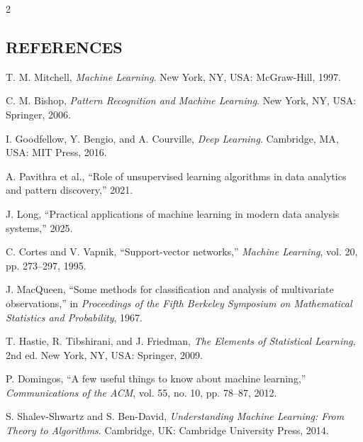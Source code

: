 \begin{multicols}{2}
  \subsection*{\centering\uppercase{References}}
  {\small
  \begin{justify}
    \begin{enumerate}[label={\relax[\arabic*]},leftmargin=*,labelsep=0.5em,itemsep=0.20em,parsep=0pt]
      \item T. M. Mitchell, \textit{Machine Learning}. New York, NY, USA: McGraw-Hill, 1997.
      \item C. M. Bishop, \textit{Pattern Recognition and Machine Learning}. New York, NY, USA: Springer, 2006.
      \item I. Goodfellow, Y. Bengio, and A. Courville, \textit{Deep Learning}. Cambridge, MA, USA: MIT Press, 2016.
      \item A. Pavithra et al., “Role of unsupervised learning algorithms in data analytics and pattern discovery,” 2021.
      \item J. Long, “Practical applications of machine learning in modern data analysis systems,” 2025.
      \item C. Cortes and V. Vapnik, “Support-vector networks,” \textit{Machine Learning}, vol. 20, pp. 273--297, 1995.
      \item J. MacQueen, “Some methods for classification and analysis of multivariate observations,” in \textit{Proceedings of the Fifth Berkeley Symposium on Mathematical Statistics and Probability}, 1967.
      \item T. Hastie, R. Tibshirani, and J. Friedman, \textit{The Elements of Statistical Learning}, 2nd ed. New York, NY, USA: Springer, 2009.
      \item P. Domingos, “A few useful things to know about machine learning,” \textit{Communications of the ACM}, vol. 55, no. 10, pp. 78--87, 2012.
      \item S. Shalev-Shwartz and S. Ben-David, \textit{Understanding Machine Learning: From Theory to Algorithms}. Cambridge, UK: Cambridge University Press, 2014.
    \end{enumerate}
  \end{justify}}
\end{multicols}
